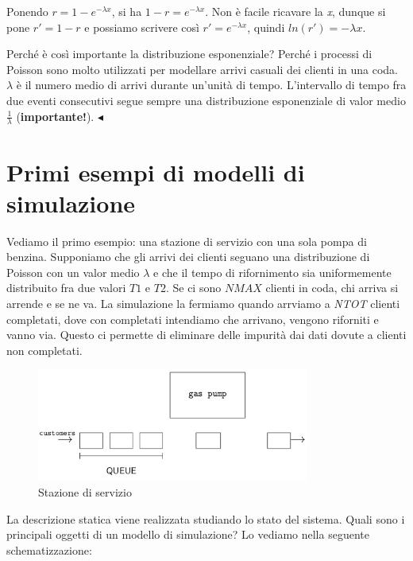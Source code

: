 \documentclass[11pt]{book}
\begin{document}
Ponendo $r = 1-e^{-\lambda x}$, si ha $1-r = e^{-\lambda x}$. Non \`e
facile ricavare la {\em x}, dunque si pone $r' = 1-r$ e possiamo
scrivere cos\`i $r' = e^{-\lambda x}$, quindi $ln(r') = -\lambda x$.

Perch\'e \`e cos\`i importante la distribuzione esponenziale? Perch\'e
i processi di Poisson sono molto utilizzati per modellare arrivi
casuali dei clienti in una coda. $\lambda$ \`e il numero medio di
arrivi durante un'unit\`a di tempo. L'intervallo di tempo fra due
eventi consecutivi segue sempre una distribuzione esponenziale di
valor medio $\frac{1}{\lambda}$ ({\bf importante!}).
$\blacktriangleleft$
\vspace{11pt}

\section{Primi esempi di modelli di simulazione}

Vediamo il primo esempio: una stazione di servizio con una sola pompa
di benzina. Supponiamo che gli arrivi dei clienti seguano una
distribuzione di Poisson con un valor medio $\lambda$ e che il tempo
di rifornimento sia uniformemente distribuito fra due valori $T1$ e
$T2$. Se ci sono $NMAX$ clienti in coda, chi arriva si arrende e se ne
va. La simulazione la fermiamo quando arrviamo a {\em NTOT} clienti
completati, dove con completati intendiamo che arrivano, vengono
riforniti e vanno via. Questo ci permette di eliminare delle
impurit\`a dai dati dovute a clienti non completati.

\begin{figure}[H]
  \centering
  \includegraphics[width=0.8\textwidth]{images/cap11fig4.png}
  \caption{Stazione di servizio}
  \label{cap11fig4}
\end{figure}

La descrizione statica viene realizzata studiando lo stato del
sistema. Quali sono i principali oggetti di un modello di simulazione?
Lo vediamo nella seguente schematizzazione:
\end{document}
